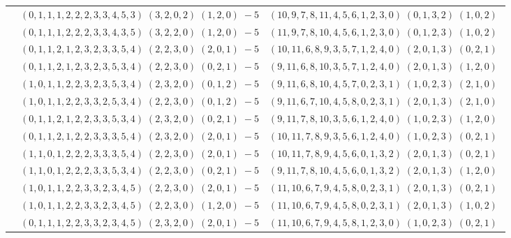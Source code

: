 \documentclass[11pt]{article}
\begin{document}
\begin{longtable}[l]{|c|c|c|}
 \cline{2-3} 
 & $(0 ,1 ,1 ,1 ,2 ,2 ,2 ,3 ,3 ,4 ,5 ,3) \;(3 ,2 ,0 ,2) \;(1 ,2 ,0) \;-5$ & $(10 ,9 ,7 ,8 ,11 ,4 ,5 ,6 ,1 ,2 ,3 ,0) \;(0 ,1 ,3 ,2) \;(1 ,0 ,2) \;$\\ 
 \cline{2-3} 
 & $(0 ,1 ,1 ,1 ,2 ,2 ,2 ,3 ,3 ,4 ,3 ,5) \;(3 ,2 ,2 ,0) \;(1 ,2 ,0) \;-5$ & $(11 ,9 ,7 ,8 ,10 ,4 ,5 ,6 ,1 ,2 ,3 ,0) \;(0 ,1 ,2 ,3) \;(1 ,0 ,2) \;$\\ 
 \cline{2-3} 
 & $(0 ,1 ,1 ,2 ,1 ,2 ,3 ,2 ,3 ,3 ,5 ,4) \;(2 ,2 ,3 ,0) \;(2 ,0 ,1) \;-5$ & $(10 ,11 ,6 ,8 ,9 ,3 ,5 ,7 ,1 ,2 ,4 ,0) \;(2 ,0 ,1 ,3) \;(0 ,2 ,1) \;$\\ 
 \cline{2-3} 
 & $(0 ,1 ,1 ,2 ,1 ,2 ,3 ,2 ,3 ,5 ,3 ,4) \;(2 ,2 ,3 ,0) \;(0 ,2 ,1) \;-5$ & $(9 ,11 ,6 ,8 ,10 ,3 ,5 ,7 ,1 ,2 ,4 ,0) \;(2 ,0 ,1 ,3) \;(1 ,2 ,0) \;$\\ 
 \cline{2-3} 
 & $(1 ,0 ,1 ,1 ,2 ,2 ,3 ,2 ,3 ,5 ,3 ,4) \;(2 ,3 ,2 ,0) \;(0 ,1 ,2) \;-5$ & $(9 ,11 ,6 ,8 ,10 ,4 ,5 ,7 ,0 ,2 ,3 ,1) \;(1 ,0 ,2 ,3) \;(2 ,1 ,0) \;$\\ 
 \cline{2-3} 
 & $(1 ,0 ,1 ,1 ,2 ,2 ,3 ,3 ,2 ,5 ,3 ,4) \;(2 ,2 ,3 ,0) \;(0 ,1 ,2) \;-5$ & $(9 ,11 ,6 ,7 ,10 ,4 ,5 ,8 ,0 ,2 ,3 ,1) \;(2 ,0 ,1 ,3) \;(2 ,1 ,0) \;$\\ 
 \cline{2-3} 
 & $(0 ,1 ,1 ,2 ,1 ,2 ,2 ,3 ,3 ,5 ,3 ,4) \;(2 ,3 ,2 ,0) \;(0 ,2 ,1) \;-5$ & $(9 ,11 ,7 ,8 ,10 ,3 ,5 ,6 ,1 ,2 ,4 ,0) \;(1 ,0 ,2 ,3) \;(1 ,2 ,0) \;$\\ 
 \cline{2-3} 
 & $(0 ,1 ,1 ,2 ,1 ,2 ,2 ,3 ,3 ,3 ,5 ,4) \;(2 ,3 ,2 ,0) \;(2 ,0 ,1) \;-5$ & $(10 ,11 ,7 ,8 ,9 ,3 ,5 ,6 ,1 ,2 ,4 ,0) \;(1 ,0 ,2 ,3) \;(0 ,2 ,1) \;$\\ 
 \cline{2-3} 
 & $(1 ,1 ,0 ,1 ,2 ,2 ,2 ,3 ,3 ,3 ,5 ,4) \;(2 ,2 ,3 ,0) \;(2 ,0 ,1) \;-5$ & $(10 ,11 ,7 ,8 ,9 ,4 ,5 ,6 ,0 ,1 ,3 ,2) \;(2 ,0 ,1 ,3) \;(0 ,2 ,1) \;$\\ 
 \cline{2-3} 
 & $(1 ,1 ,0 ,1 ,2 ,2 ,2 ,3 ,3 ,5 ,3 ,4) \;(2 ,2 ,3 ,0) \;(0 ,2 ,1) \;-5$ & $(9 ,11 ,7 ,8 ,10 ,4 ,5 ,6 ,0 ,1 ,3 ,2) \;(2 ,0 ,1 ,3) \;(1 ,2 ,0) \;$\\ 
 \cline{2-3} 
 & $(1 ,0 ,1 ,1 ,2 ,2 ,3 ,3 ,2 ,3 ,4 ,5) \;(2 ,2 ,3 ,0) \;(2 ,0 ,1) \;-5$ & $(11 ,10 ,6 ,7 ,9 ,4 ,5 ,8 ,0 ,2 ,3 ,1) \;(2 ,0 ,1 ,3) \;(0 ,2 ,1) \;$\\ 
 \cline{2-3} 
 & $(1 ,0 ,1 ,1 ,2 ,2 ,3 ,3 ,2 ,3 ,4 ,5) \;(2 ,2 ,3 ,0) \;(1 ,2 ,0) \;-5$ & $(11 ,10 ,6 ,7 ,9 ,4 ,5 ,8 ,0 ,2 ,3 ,1) \;(2 ,0 ,1 ,3) \;(1 ,0 ,2) \;$\\ 
 \cline{2-3} 
 & $(0 ,1 ,1 ,1 ,2 ,2 ,3 ,3 ,2 ,3 ,4 ,5) \;(2 ,3 ,2 ,0) \;(2 ,0 ,1) \;-5$ & $(11 ,10 ,6 ,7 ,9 ,4 ,5 ,8 ,1 ,2 ,3 ,0) \;(1 ,0 ,2 ,3) \;(0 ,2 ,1) \;$\\ 

\end{longtable}
\end{document}
